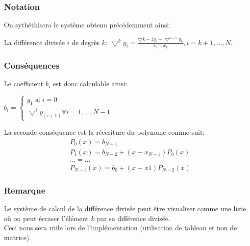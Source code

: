 \documentclass{report}
\begin{document}
\subsubsection{Notation}
On sythéthisera le système obtenu précédemment ainsi: \\
\begin{center}
La différence divisée $i$ de degrès $k$: $\bigtriangledown^{k}y_i = \frac{\bigtriangledown{k-1}y_i -\bigtriangledown^{k-1}y_k}{x_i - x_k}, i= k+1, \ldots, N.  $
\end{center}
\subsubsection{Conséquences}
Le coefficient $b_i$ est donc calculable ainsi:
\begin{center}
$b_i =
\begin{cases}
y_1 \text{ si } i=0  \\
\bigtriangledown^{i}y_{(i+1)} \forall i = 1,\ldots, N-1
\end{cases}
$
\end{center}
La seconde conséquence est la réecriture du polynome comme suit:\\
\begin{align*}
&P_0(x) = b_{N-1} \\
&P_1(x) = b_{N-2} + (x-x_{N-1})P_0(x) \\
&\ldots = \ldots \\
&P_{N-1}(x) = b_0 + (x-x1)P_{N-2}(x)
\end{align*}
\subsubsection{Remarque}
Le système de calcul de la différence divisée peut être visualiser comme une liste où on peut écraser l'élément $k$ par sa différence divisée.\\
Ceci nous sera utile lors de l'implémentation (utilisation de tableau et non de matrice).
\newpage
\end{document}
